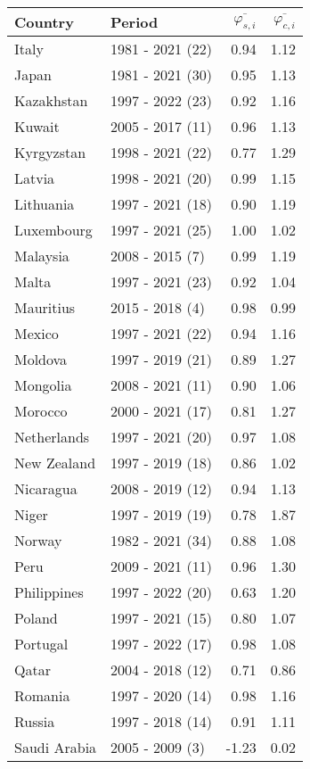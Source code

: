 \begin{table}[H]
{{\centering
\begin{tabular}{llrr}
\toprule
Country & Period & $\overline{\varphi_{s,i}}$ & $\overline{\varphi_{c,i}}$\\
\midrule
Italy & 1981 - 2021 (22) & 0.94 & 1.12\\
Japan & 1981 - 2021 (30) & 0.95 & 1.13\\
Kazakhstan & 1997 - 2022 (23) & 0.92 & 1.16\\
Kuwait & 2005 - 2017 (11) & 0.96 & 1.13\\
Kyrgyzstan & 1998 - 2021 (22) & 0.77 & 1.29\\
\addlinespace
Latvia & 1998 - 2021 (20) & 0.99 & 1.15\\
Lithuania & 1997 - 2021 (18) & 0.90 & 1.19\\
Luxembourg & 1997 - 2021 (25) & 1.00 & 1.02\\
Malaysia & 2008 - 2015 (7) & 0.99 & 1.19\\
Malta & 1997 - 2021 (23) & 0.92 & 1.04\\
\addlinespace
Mauritius & 2015 - 2018 (4) & 0.98 & 0.99\\
Mexico & 1997 - 2021 (22) & 0.94 & 1.16\\
Moldova & 1997 - 2019 (21) & 0.89 & 1.27\\
Mongolia & 2008 - 2021 (11) & 0.90 & 1.06\\
Morocco & 2000 - 2021 (17) & 0.81 & 1.27\\
\addlinespace
Netherlands & 1997 - 2021 (20) & 0.97 & 1.08\\
New Zealand & 1997 - 2019 (18) & 0.86 & 1.02\\
Nicaragua & 2008 - 2019 (12) & 0.94 & 1.13\\
Niger & 1997 - 2019 (19) & 0.78 & 1.87\\
Norway & 1982 - 2021 (34) & 0.88 & 1.08\\
\addlinespace
Peru & 2009 - 2021 (11) & 0.96 & 1.30\\
Philippines & 1997 - 2022 (20) & 0.63 & 1.20\\
Poland & 1997 - 2021 (15) & 0.80 & 1.07\\
Portugal & 1997 - 2022 (17) & 0.98 & 1.08\\
Qatar & 2004 - 2018 (12) & 0.71 & 0.86\\
\addlinespace
Romania & 1997 - 2020 (14) & 0.98 & 1.16\\
Russia & 1997 - 2018 (14) & 0.91 & 1.11\\
Saudi Arabia & 2005 - 2009 (3) & -1.23 & 0.02\\

\end{tabular}}}
\end{table}
